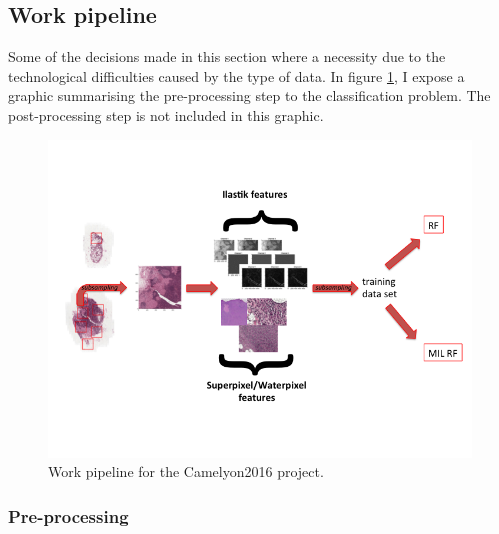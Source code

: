 \documentclass[a4paper,10pt]{article}
\begin{document}
\subsection{Work pipeline}
Some of the decisions made in this section where a necessity due to the technological difficulties caused by the type of data. In figure \ref{PipelineCam}, I expose a graphic summarising the pre-processing step to the classification problem. The post-processing step is not included in this graphic.

\begin{figure}[!ht]
\centering
\includegraphics[width=\textwidth]{workflow.png}
\caption{Work pipeline for the Camelyon2016 project.}
\label{PipelineCam}
\end{figure}


\subsubsection{Pre-processing}
\end{document}
